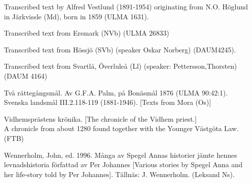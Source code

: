 \begin{listWWNumileveli}
\item 

\begin{styleSource}
Transcribed text by Alfred Vestlund (1891-1954) originating from N.O. Höglund in Järkvissle (Md), born in 1859 (ULMA 1631).

\end{styleSource}

\item 

\begin{styleSource}
\label{bkm:Ref137880753}Transcribed text from Ersmark (NVb) (ULMA 26833) 

\end{styleSource}

\item 

\begin{styleSource}
\label{bkm:Ref137882624}Transcribed text from Hössjö (SVb) (speaker Oskar Norberg) (DAUM4245).

\end{styleSource}

\item 

\begin{styleSource}
Transcribed text from Svartlå, Överluleå (Ll) (speaker: Pettersson,Thorsten) (DAUM 4164)

\end{styleSource}

\item 

\begin{styleSource}
\label{bkm:Ref154203986}Två rättegångsmål. Av G.F.A. Palm, på Bonäsmål 1876 (ULMA 90:42:1). Svenska landsmål III.2.118-119 (1881-1946). [Texts from Mora (Os)]

\end{styleSource}

\item 

\begin{styleSource}
\label{bkm:Ref261512115}\label{bkm:Ref137879614}Vidhemsprästens krönika. [The chronicle of the Vidhem priest.]\\
A chronicle from about 1280 found together with the Younger Västgöta Law. (FTB) 

\end{styleSource}

\item 

\begin{styleSource}
\label{bkm:Ref150327539}\label{bkm:Ref150067493}Wennerholm, John, ed. 1996. Många av Spegel Annas historier jämte hennes levnadshistoria författad av Per Johannes [Various stories by Spegel Anna and her life-story told by Per Johannes]. Tällnäs: J. Wennerholm. (Leksand Ns). 

\end{styleSource}

\end{listWWNumileveli}

